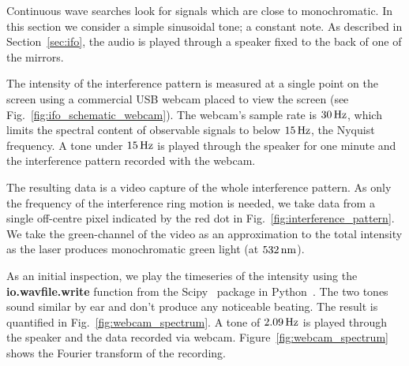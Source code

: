 \documentclass[paper-main.tex]{subfiles}
\begin{document}

Continuous wave searches look for signals which are close to monochromatic. 
In this section we consider a simple sinusoidal tone; a constant note. 
As described in Section~\ref{sec:ifo}, the audio is played through a speaker fixed to the back of one of the mirrors.


The intensity of the interference pattern is measured at a single point on the screen using a commercial USB webcam placed to view the screen (see Fig.~\ref{fig:ifo_schematic_webcam}). 
The webcam's sample rate is $30\,{\rm Hz}$, which limits the spectral content of observable signals to below $15\,{\rm Hz}$, the Nyquist frequency.
A tone under $15\,{\rm Hz}$ is played through the speaker for one minute and the interference pattern recorded with the webcam. 


The resulting data is a video capture of the whole interference pattern. 
As only the frequency of the interference ring motion is needed, we take data from a single off-centre pixel indicated by the red dot in Fig.~\ref{fig:interference_pattern}. 
We take the green-channel of the video as an approximation to the total intensity as the laser produces monochromatic green light (at $532\,{\rm nm}$).


As an initial inspection, we play the timeseries of the intensity using the \textbf{io.wavfile.write} function from the Scipy~\cite{scipy} package in Python~\cite{python}. 
The two tones sound similar by ear and don't produce any noticeable beating. 
The result is quantified in Fig.~\ref{fig:webcam_spectrum}. 
A tone of $2.09\,{\rm Hz}$ is played through the speaker and the data recorded via webcam. 
Figure~\ref{fig:webcam_spectrum} shows the Fourier transform of the recording.
\end{document}
